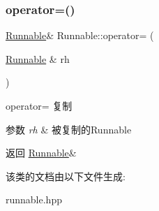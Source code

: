 \subsubsection{\texorpdfstring{operator=()}{operator=()}\hspace{0.1cm}{\footnotesize\ttfamily [2/2]}}
{\footnotesize\ttfamily \hyperlink{classRunnable}{Runnable}\& Runnable\+::operator= (\begin{DoxyParamCaption}\item[{\hyperlink{classRunnable}{Runnable} \&}]{rh }\end{DoxyParamCaption})\hspace{0.3cm}{\ttfamily [inline]}}



operator= 复制 


\begin{DoxyParams}{参数}
{\em rh} & 被复制的\+Runnable\\
\hline
\end{DoxyParams}
\begin{DoxyReturn}{返回}
\hyperlink{classRunnable}{Runnable}\& 
\end{DoxyReturn}


该类的文档由以下文件生成\+:\begin{DoxyCompactItemize}
\item 
runnable.\+hpp\end{DoxyCompactItemize}
